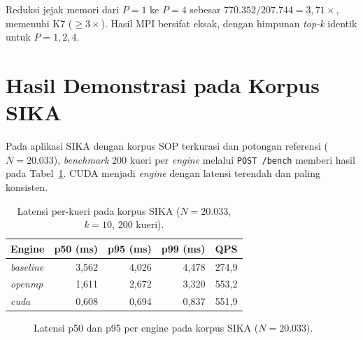 \documentclass[12pt,a4paper,oneside]{report}
\begin{document}
Reduksi jejak memori dari $P=1$ ke $P=4$ sebesar $770.352 / 207.744 = 3{,}71\times$, memenuhi K7 ($\geq 3\times$). Hasil MPI bersifat eksak, dengan himpunan \textit{top-k} identik untuk $P=1,2,4$.

\section{Hasil Demonstrasi pada Korpus SIKA}

Pada aplikasi SIKA dengan korpus SOP terkurasi dan potongan referensi ($N=20.033$), \textit{benchmark} 200 kueri per \textit{engine} melalui \texttt{POST /bench} memberi hasil pada Tabel~\ref{tab:web}. CUDA menjadi \textit{engine} dengan latensi terendah dan paling konsisten.

\begin{table}[H]
\centering
\caption{Latensi per-kueri pada korpus SIKA ($N=20.033$, $k=10$, 200 kueri).}
\label{tab:web}
\begin{tabular}{@{}l r r r r@{}}
\toprule
\textbf{Engine} & \textbf{p50 (ms)} & \textbf{p95 (ms)} & \textbf{p99 (ms)} & \textbf{QPS}\\
\midrule
\textit{baseline} & 3,562 & 4,026 & 4,478 & 274,9\\
\textit{openmp}   & 1,611 & 2,672 & 3,320 & 553,2\\
\textit{cuda}     & 0,608 & 0,694 & 0,837 & 551,9\\
\bottomrule
\end{tabular}
\end{table}

\begin{figure}[H]
\centering
{}
\caption{Latensi p50 dan p95 per engine pada korpus SIKA ($N=20.033$).}
\label{fig:latensi}
\end{figure}
\end{document}

